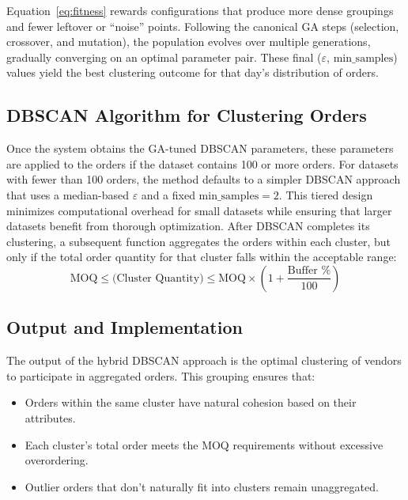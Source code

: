 Equation~\ref{eq:fitness} rewards configurations that produce more dense groupings and fewer leftover or ``noise'' points. Following the canonical GA steps (selection, crossover, and mutation), the population evolves over multiple generations, gradually converging on an optimal parameter pair. These final ($\varepsilon$, $\text{min\_samples}$) values yield the best clustering outcome for that day's distribution of orders.

\subsection{DBSCAN Algorithm for Clustering Orders}

Once the system obtains the GA-tuned DBSCAN parameters, these parameters are applied to the orders if the dataset contains 100 or more orders. For datasets with fewer than 100 orders, the method defaults to a simpler DBSCAN approach that uses a median-based $\varepsilon$ and a fixed $\text{min\_samples} = 2$. This tiered design minimizes computational overhead for small datasets while ensuring that larger datasets benefit from thorough optimization. After DBSCAN completes its clustering, a subsequent function aggregates the orders within each cluster, but only if the total order quantity for that cluster falls within the acceptable range:
\begin{equation}
    \text{MOQ} \leq \text{(Cluster Quantity)} \leq \text{MOQ} \times \left(1 + \frac{\text{Buffer \%}}{100}\right)
    \label{eq:moq}
\end{equation}

\subsection{Output and Implementation}

The output of the hybrid DBSCAN approach is the optimal clustering of vendors to participate in aggregated orders. This grouping ensures that:

\begin{itemize}
    \item Orders within the same cluster have natural cohesion based on their attributes.
    \item Each cluster's total order meets the MOQ requirements without excessive overordering.
    \item Outlier orders that don't naturally fit into clusters remain unaggregated.
\end{itemize}

